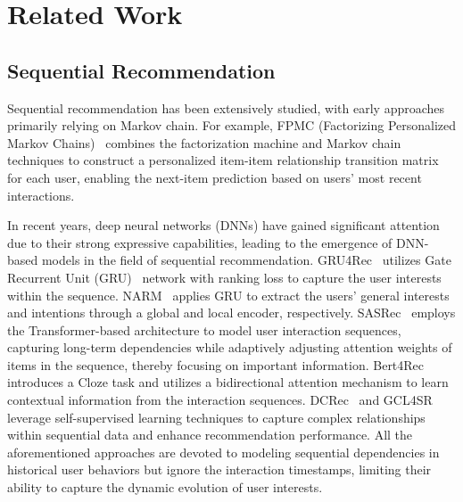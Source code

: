 \section{Related Work}
\subsection{Sequential Recommendation}
Sequential recommendation has been extensively studied, with early approaches primarily relying on Markov chain. For example, FPMC (Factorizing Personalized Markov Chains)~\cite{rendle2010factorizing} combines the factorization machine and Markov chain techniques to construct a personalized item-item relationship transition matrix for each user, enabling the next-item prediction based on users' most recent interactions.

In recent years, deep neural networks (DNNs) have gained significant attention due to their strong expressive capabilities, leading to the emergence of DNN-based models in the field of sequential recommendation. GRU4Rec~\cite{hidasi2015session} utilizes Gate Recurrent Unit (GRU)~\cite{Cho} network with ranking loss to capture the user interests within the sequence. NARM~\cite{li2017neural} applies GRU to extract the users' general interests and intentions through a global and local encoder, respectively. SASRec~\cite{kang2018self} employs the Transformer-based architecture to model user interaction sequences, capturing long-term dependencies while adaptively adjusting attention weights of items in the sequence, thereby focusing on important information. Bert4Rec~\cite{sun2019bert4rec} introduces a Cloze task and utilizes a bidirectional attention mechanism to learn contextual information from the interaction sequences. DCRec~\cite{Yang2023DCRec} and GCL4SR~\cite{zhang2022GCL4SR} leverage self-supervised learning techniques to capture complex relationships within sequential data and enhance recommendation performance. All the aforementioned approaches are devoted to modeling sequential dependencies in historical user behaviors but ignore the interaction timestamps, limiting their ability to capture the dynamic evolution of user interests.

